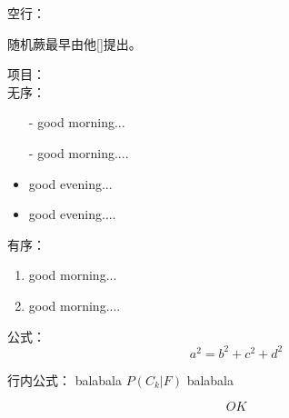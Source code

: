 
空行：
\newline

随机蕨最早由他[]提出\cite{ozuysal2007fast}。

项目：\\
无序：
\begin{itemize}
\item[-] good morning...
\item[-] good morning....
\end{itemize}

\begin{itemize}
\item good evening...
\item good evening....
\end{itemize}

有序：
\begin{enumerate}
\item good morning...
\item good morning....
\end{enumerate}

公式：
\begin{equation}
	a^2=b^2+c^2+d^2
\end{equation}

行内公式：
balabala
$P(C_k|F)$
balabala


\begin{equation}
	OK
\end{equation}

